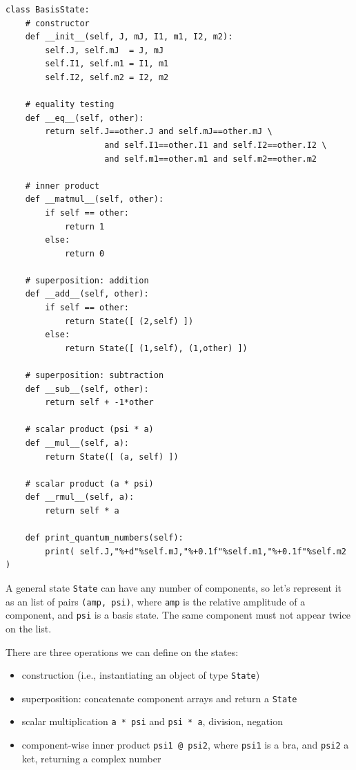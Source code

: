 \begin{lstlisting}
class BasisState:
    # constructor
    def __init__(self, J, mJ, I1, m1, I2, m2):
        self.J, self.mJ  = J, mJ
        self.I1, self.m1 = I1, m1
        self.I2, self.m2 = I2, m2

    # equality testing
    def __eq__(self, other):
        return self.J==other.J and self.mJ==other.mJ \
                    and self.I1==other.I1 and self.I2==other.I2 \
                    and self.m1==other.m1 and self.m2==other.m2

    # inner product
    def __matmul__(self, other):
        if self == other:
            return 1
        else:
            return 0

    # superposition: addition
    def __add__(self, other):
        if self == other:
            return State([ (2,self) ])
        else:
            return State([ (1,self), (1,other) ])

    # superposition: subtraction
    def __sub__(self, other):
        return self + -1*other

    # scalar product (psi * a)
    def __mul__(self, a):
        return State([ (a, self) ])

    # scalar product (a * psi)
    def __rmul__(self, a):
        return self * a
    
    def print_quantum_numbers(self):
        print( self.J,"%+d"%self.mJ,"%+0.1f"%self.m1,"%+0.1f"%self.m2 )
\end{lstlisting}

A general state \verb`State` can have any number of components, so let's
represent it as an list of pairs \verb`(amp, psi)`, where \verb`amp` is the
relative amplitude of a component, and \verb`psi` is a basis state. The same
component must not appear twice on the list.

There are three operations we can define on the states:

\begin{itemize}
    \item construction (i.e., instantiating an object of type \verb`State`)
   \item superposition: concatenate component arrays and return a \verb`State`
   \item scalar multiplication \verb`a * psi` and \verb`psi * a`, division, negation
   \item component-wise inner product \verb`psi1 @ psi2`, where \verb`psi1` is a bra,
and \verb`psi2` a ket, returning a complex number
\end{itemize}

